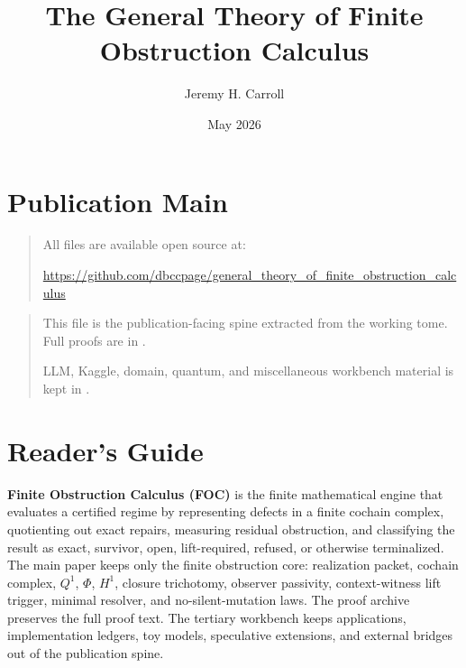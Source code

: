 \documentclass[11pt]{article}
\title{The General Theory of Finite Obstruction Calculus}
\author{Jeremy H. Carroll}
\date{May 2026}
\theoremstyle{definition}
\begin{document}
\maketitle

\section*{Publication Main}

\begin{quote}
All files are available open source at:\par\smallskip\noindent\url{https://github.com/dbccpage/general_theory_of_finite_obstruction_calculus}
\end{quote}

\begin{quote}
This file is the publication-facing spine extracted from the working tome. Full proofs are in .\par\smallskip
LLM, Kaggle, domain, quantum, and miscellaneous workbench material is kept in .
\end{quote}

\section*{Reader's Guide}

\textbf{Finite Obstruction Calculus (FOC)} is the finite mathematical engine that evaluates a certified regime by representing defects in a finite cochain complex, quotienting out exact repairs, measuring residual obstruction, and classifying the result as exact, survivor, open, lift-required, refused, or otherwise terminalized. The main paper keeps only the finite obstruction core: realization packet, cochain complex, \(Q^1\), \(\Phi\), \(H^1\), closure trichotomy, observer passivity, context-witness lift trigger, minimal resolver, and no-silent-mutation laws. The proof archive preserves the full proof text. The tertiary workbench keeps applications, implementation ledgers, toy models, speculative extensions, and external bridges out of the publication spine.
\end{document}

